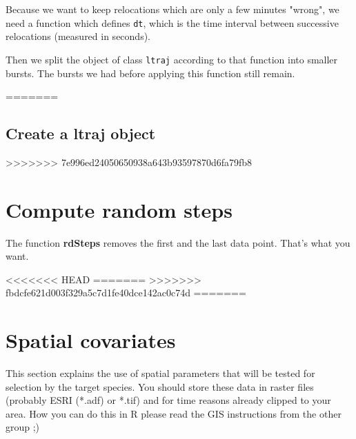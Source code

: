 \documentclass[11pt, a4paper]{article} %
\begin{document}
Because we want to keep relocations which are only a few minutes "wrong", we need a function which defines \texttt{dt}, which is the time interval between successive relocations (measured in seconds).

\begin{knitrout}
\color{fgcolor}\begin{kframe}
\begin{alltt}
 \hlkwb{=} \hlstd{(}\hlstd{) \{}\hlopt{>} \hlstd{(}\hlopt{*}\hlstd{))\}}
\end{alltt}
\end{kframe}
\end{knitrout}

Then we split the object of class \texttt{ltraj} according to that function into smaller bursts. The bursts we had before applying this function still remain.

\begin{knitrout}
\color{fgcolor}\begin{kframe}
\begin{alltt}
 \hlkwb{<-}  \hlstd{,}  \hlstd{=} \hlstd{)}
\end{alltt}
\end{kframe}
\end{knitrout}

=======
\subsection{Create a ltraj object}%
 
>>>>>>> 7e996ed24050650938a643b93597870d6fa79fb8

\section{Compute random steps}

The function \textbf{rdSteps} removes the first and the last data point. That's what you want. 

<<<<<<< HEAD
=======
>>>>>>> fbdcfe621d003f329a5c7d1fe40dce142ac0c74d
=======
\section{Spatial covariates}%
This section explains the use of spatial parameters that will be tested for selection by the target species. You should store these data in raster files (probably ESRI (*.adf) or *.tif) and for time reasons already clipped to your area. How you can do this in R please read the GIS instructions from the other group ;)   
\end{document}
